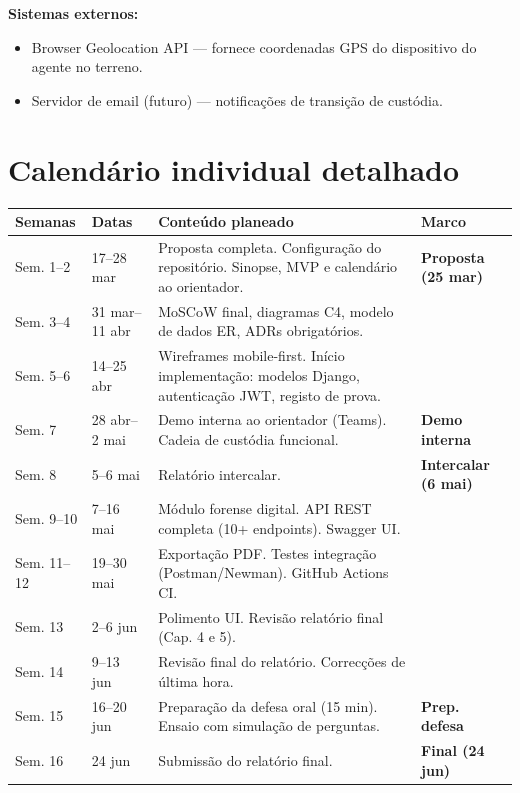\documentclass[a4paper,11pt]{article}
\begin{document}
\textbf{Sistemas externos:}
\begin{itemize}[nosep]
    \item Browser Geolocation API --- fornece coordenadas GPS do dispositivo do
    agente no terreno.
    \item Servidor de email (futuro) --- notificações de transição de custódia.
\end{itemize}

\section{Calendário individual detalhado}

\begin{longtable}{L{1.8cm} L{3.2cm} L{7cm} L{3cm}}
    \toprule
    \textbf{Semanas} & \textbf{Datas} & \textbf{Conteúdo planeado} & \textbf{Marco} \\
    \midrule
    \endhead
    Sem. 1--2  & 17--28 mar
        & Proposta completa. Configuração do repositório. Sinopse, MVP e calendário ao orientador.
        & \textbf{Proposta (25 mar)} \\[0.4em]
    Sem. 3--4  & 31 mar--11 abr
        & MoSCoW final, diagramas C4, modelo de dados ER, ADRs obrigatórios.
        & \\[0.4em]
    Sem. 5--6  & 14--25 abr
        & Wireframes mobile-first. Início implementação: modelos Django, autenticação JWT, registo de prova.
        & \\[0.4em]
    Sem. 7     & 28 abr--2 mai
        & Demo interna ao orientador (Teams). Cadeia de custódia funcional.
        & \textbf{Demo interna} \\[0.4em]
    Sem. 8     & 5--6 mai
        & Relatório intercalar.
        & \textbf{Intercalar (6 mai)} \\[0.4em]
    Sem. 9--10 & 7--16 mai
        & Módulo forense digital. API REST completa (10+ endpoints). Swagger UI.
        & \\[0.4em]
    Sem. 11--12 & 19--30 mai
        & Exportação PDF. Testes integração (Postman/Newman). GitHub Actions CI.
        & \\[0.4em]
    Sem. 13    & 2--6 jun
        & Polimento UI. Revisão relatório final (Cap. 4 e 5).
        & \\[0.4em]
    Sem. 14    & 9--13 jun
        & Revisão final do relatório. Correcções de última hora.
        & \\[0.4em]
    Sem. 15    & 16--20 jun
        & Preparação da defesa oral (15 min). Ensaio com simulação de perguntas.
        & \textbf{Prep. defesa} \\[0.4em]
    Sem. 16    & 24 jun
        & Submissão do relatório final.
        & \textbf{Final (24 jun)} \\
    \bottomrule
\end{longtable}
\end{document}
